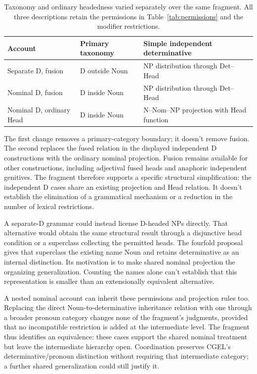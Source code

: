 \documentclass[12pt]{article}
\begin{document}
\begin{table}[tb]
\centering\small
\caption{Taxonomy and ordinary headedness varied separately over the same fragment. All three descriptions retain the permissions in Table~\ref{tab:permissions} and the modifier restrictions.}\label{tab:economy}
\begin{tabular}{>{\raggedright\arraybackslash}p{3.1cm}>{\raggedright\arraybackslash}p{3.9cm}>{\raggedright\arraybackslash}p{4.7cm}}
\toprule
Account & Primary taxonomy & Simple independent determinative \\
\midrule
Separate D, fusion & D outside Noun & NP distribution through Det--Head \\
Nominal D, fusion & D inside Noun & NP distribution through Det--Head \\
Nominal D, ordinary Head & D inside Noun & N--Nom--NP projection with Head function \\
\bottomrule
\end{tabular}
\end{table}

The first change removes a primary-category boundary; it doesn't remove fusion. The second replaces the fused relation in the displayed independent D constructions with the ordinary nominal projection. Fusion remains available for other constructions, including adjectival fused heads and anaphoric independent genitives. The fragment therefore supports a specific structural simplification: the independent D cases share an existing projection and Head relation. It doesn't establish the elimination of a grammatical mechanism or a reduction in the number of lexical restrictions.

A separate-D grammar could instead license D-headed NPs directly. That alternative would obtain the same structural result through a disjunctive head condition or a superclass collecting the permitted heads. The fourfold proposal gives that superclass the existing name Noun and retains determinative as an internal distinction. Its motivation is to make shared nominal projection the organizing generalization. Counting the names alone can't establish that this representation is smaller than an extensionally equivalent alternative.

A nested nominal account can inherit these permissions and projection rules too. Replacing the direct Noun-to-determinative inheritance relation with one through a broader pronoun category changes none of the fragment's judgments, provided that no incompatible restriction is added at the intermediate level. The fragment thus identifies an equivalence: these cases support the shared nominal treatment but leave the intermediate hierarchy open. Coordination preserves CGEL's determinative/pronoun distinction without requiring that intermediate category; a further shared generalization could still justify it.
\end{document}
